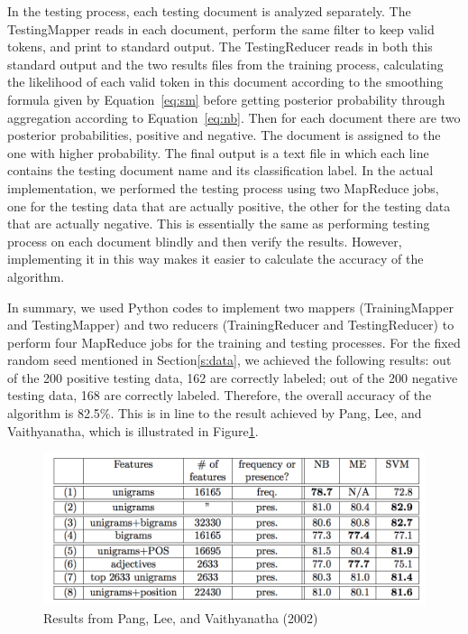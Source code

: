 In the testing process, each testing document is analyzed
separately. The TestingMapper reads in each document, perform the same
filter to keep valid tokens, and print to standard output. The
TestingReducer reads in both this standard output and the two results
files from the training process, calculating the likelihood of each
valid token in this document according to the smoothing formula given
by Equation~\ref{eq:sm} before getting posterior probability through
aggregation according to Equation~\ref{eq:nb}. Then for each document
there are two posterior probabilities, positive and negative. The
document is assigned to the one with higher probability. The final
output is a text file in which each line contains the testing document
name and its classification label. In the actual implementation, we
performed the testing process using two MapReduce jobs, one for the
testing data that are actually positive, the other for the testing
data that are actually negative. This is essentially the same as
performing testing process on each document blindly and then verify
the results. However, implementing it in this way makes it easier to
calculate the accuracy of the algorithm.
 
In summary, we used Python codes to implement two mappers
(TrainingMapper and TestingMapper) and two reducers (TrainingReducer
and TestingReducer) to perform four MapReduce jobs for the training
and testing processes. For the fixed random seed mentioned in
Section\ref{s:data}, we achieved the following results: out of the 200
positive testing data, 162 are correctly labeled; out of the 200
negative testing data, 168 are correctly labeled. Therefore, the
overall accuracy of the algorithm is 82.5\%. This is in line to the
result achieved by Pang, Lee, and Vaithyanatha, which is illustrated
in Figure\ref{f:pang-result}.
% 

\begin{figure}[!ht]
	\centering\includegraphics[width=\columnwidth]{images/pang-result.png}
        \caption{Results
	from Pang, Lee, and Vaithyanatha
	(2002)~\cite{hid-sp18-405-sentiment-pang2002thumbs}}\label{f:pang-result}
\end{figure}


